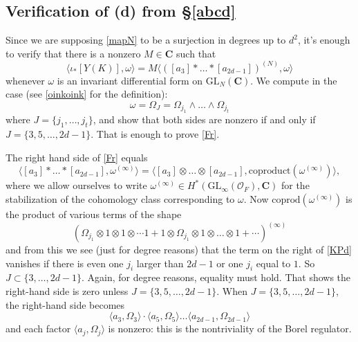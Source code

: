 \documentclass[10pt]{amsart}
\newcommand{\coproduct}{\mathrm{coprod}}
\newcommand{\C}{\mathbf{C}}
\newcommand{\GL}{\mathrm{GL}}
\theoremstyle{remark}
\begin{document}
 
 
 \subsection{Verification of (d) from \S \ref{abcd}} 
 Since we are supposing \eqref{mapN} to be a surjection in degrees up to $d^2$, it's enough to 
verify that there is a nonzero $M \in \mathbf{C}$ such that 
\begin{equation} \label{Fr}  \langle \iota_* [Y(K)], \omega \rangle =   M  \langle \left(  [a_3]* \dots * [a_{2d-1}] \right)^{(N)},  \omega \rangle\end{equation}
 whenever $\omega$ is an invariant differential form on $\GL_N(\C)$.
We compute in the case  (see \eqref{oinkoink} for the definition):
$$\omega = \Omega_J = \Omega_{j_1} \wedge \dots \wedge \Omega_{j_t}$$
where $J = \{j_1, \dots, j_t\}$, and  show that both
sides   are nonzero  if and only if $J=\{3, 5, \dots, 2d-1\}$. That is enough to prove \eqref{Fr}. 


 

 The right hand side  of \eqref{Fr} equals 
\begin{equation} \label{KPd} \langle  [a_3]* \dots * [a_{2d-1}] , \omega^{(\infty)}  \rangle = \langle  [a_3] \otimes  \dots \otimes [a_{2d-1}], \mathrm{coproduct}(\omega^{(\infty)}) \rangle,\end{equation}
 where we allow ourselves to write $\omega^{(\infty)} \in H^*(\GL_{\infty}(\mathcal{O}_F), \C)$ for the  stabilization of the  cohomology class corresponding to $\omega$. 
 Now $\coproduct(\omega^{(\infty)} ) $ 
 is the product
 of various terms of the shape
  $$  \left( \Omega_{j_1} \otimes 1 \otimes 1 \otimes \cdots 1 + 1 \otimes \Omega_{j_1} \otimes 1 \otimes \dots \otimes 1 + \cdots \right)^{(\infty)} $$
 and from this we see (just for degree reasons) that the term on the right of \eqref{KPd} vanishes if there is even one $j_i$ larger than $2d-1$
 or one $j_i$ equal to $1$.  
 So  $J \subset \{3, \dots, 2d-1\}$. Again, for degree reasons, equality must hold. That shows the right-hand side is zero unless  $J=\{3, 5, \dots, 2d-1\}$.
 When $J=\{3, 5, \dots, 2d-1\}$, the right-hand side becomes 
 $$ \langle a_3, \Omega_3 \rangle \cdot  \langle a_5, \Omega_5 \rangle \dots  \langle a_{2d-1}, \Omega_{2d-1} \rangle$$
 and each factor $\langle a_j, \Omega_j \rangle$ is  nonzero: this is the nontriviality of the Borel regulator. 
 
  
%
%
%
%
%
%
%
%
 
 
  
\end{document}
